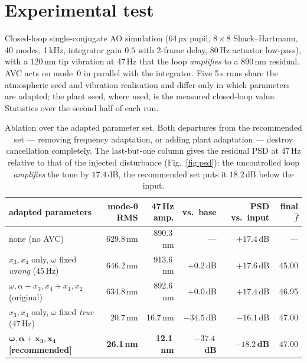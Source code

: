 \documentclass[11pt]{article}
\newcommand{\SI}[2]{#1\,#2}
\begin{document}
\section{Experimental test}

Closed-loop single-conjugate AO simulation (\SI{64}{px} pupil, $8\times8$
Shack--Hartmann, 40 modes, \SI{1}{kHz}, integrator gain $0.5$ with 2-frame
delay, \SI{80}{Hz} actuator low-pass), with a \SI{120}{nm} tip vibration at
\SI{47}{Hz} that the loop \emph{amplifies} to a \SI{890}{nm} residual. AVC
acts on mode~0 in parallel with the integrator. Five \SI{5}{s} runs share
the atmospheric seed and vibration realisation and differ only in which
parameters are adapted; the plant seed, where used, is the measured
closed-loop value. Statistics over the second half of each run.

\begin{table}[h]
  \centering\small
  \begin{tabular}{lrrrrr}
    \toprule
    adapted parameters & mode-0 RMS & \SI{47}{Hz} amp. & vs.\ base & PSD vs.\ input & final $\hat f$\\
    \midrule
    none (no AVC)                                   & \SI{629.8}{nm} & \SI{890.3}{nm} & ---        & $+17.4$\,dB & ---\\
    $x_3,x_4$ only, $\omega$ fixed \emph{wrong} (45\,Hz) & \SI{646.2}{nm} & \SI{913.6}{nm} & $+0.2$\,dB & $+17.6$\,dB & 45.00\\
    $\omega,\alpha+x_3,x_4+x_1,x_2$ (original)      & \SI{634.8}{nm} & \SI{892.6}{nm} & $+0.0$\,dB & $+17.4$\,dB & 46.95\\
    $x_3,x_4$ only, $\omega$ fixed \emph{true} (47\,Hz)  & \SI{20.7}{nm}  & \SI{16.7}{nm}  & $-34.5$\,dB & $-16.1$\,dB & 47.00\\
    $\boldsymbol{\omega,\alpha+x_3,x_4}$ \textbf{[recommended]} & \textbf{\SI{26.1}{nm}} & \textbf{\SI{12.1}{nm}} & $\mathbf{-37.4}$\,\textbf{dB} & $\mathbf{-18.2}$\,\textbf{dB} & 47.00\\
    \bottomrule
  \end{tabular}
  \caption{Ablation over the adapted parameter set. Both departures from
  the recommended set --- removing frequency adaptation, or adding plant
  adaptation --- destroy cancellation completely. The last-but-one column
  gives the residual PSD at \SI{47}{Hz} relative to that of the injected
  disturbance (Fig.~\ref{fig:psd}): the uncontrolled loop \emph{amplifies}
  the tone by $17.4$\,dB, the recommended set puts it $18.2$\,dB below the
  input.}
  \label{tab:abl}
\end{table}
\end{document}
